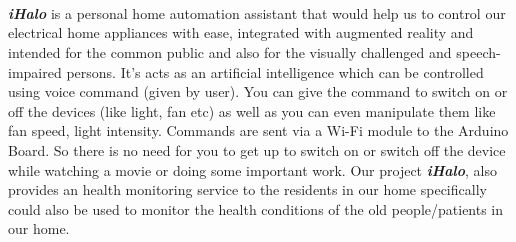 \newpage
\section*{ }

\vspace{.5cm}
	
	
	\\
	\indent \textbf{\textit{iHalo}} is a personal home automation assistant that would help us to control our electrical
home appliances with ease, integrated with augmented reality and intended for the common
public and also for the visually challenged and speech-impaired persons. It’s acts as an
artificial intelligence which can be controlled using voice command (given by user). You can
give the command to switch on or off the devices (like light, fan etc) as well as you can even
manipulate them like fan speed, light intensity. Commands are sent via a Wi-Fi module to the
Arduino Board. So there is no need for you to get up to switch on or switch off the device
while watching a movie or doing some important work. Our project  \textbf{\textit{iHalo}}, also provides an
health monitoring service to the residents in our home specifically could also be used to
monitor the health conditions of the old people/patients in our home.
